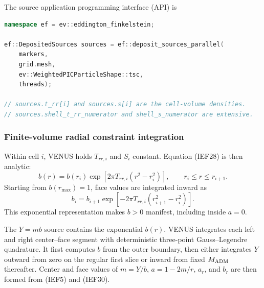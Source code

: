 The source application programming interface (API) is
\begin{lstlisting}[language=C++,basicstyle=\ttfamily\scriptsize]
namespace ef = ev::eddington_finkelstein;

ef::DepositedSources sources = ef::deposit_sources_parallel(
    markers,
    grid.mesh,
    ev::WeightedPICParticleShape::tsc,
    threads);

// sources.t_rr[i] and sources.s[i] are the cell-volume densities.
// sources.shell_t_rr_numerator and shell_s_numerator are extensive.
\end{lstlisting}

\subsubsection{Finite-volume radial constraint integration}

Within cell \(i\), VENUS holds \(T_{rr,i}\) and \(S_i\) constant.  Equation
(IEF28) is then analytic:
\[
 b(r)=b(r_i)\exp\left[
 2\pi T_{rr,i}(r^2-r_i^2)\right],
 \qquad r_i\le r\le r_{i+1}.                           \tag{IEF52}
\]
Starting from \(b(r_{\max})=1\), face values are integrated inward as
\[
 b_i=b_{i+1}\exp\left[-2\pi T_{rr,i}
             (r_{i+1}^2-r_i^2)\right].                 \tag{IEF53}
\]
This exponential representation makes \(b>0\) manifest, including inside
\(a=0\).

The \(Y=mb\) source contains the exponential \(b(r)\).  VENUS integrates each
left and right center--face segment with deterministic three-point
Gauss--Legendre quadrature.  It first computes \(b\) from the outer boundary,
then either integrates \(Y\) outward from zero on the regular first slice or
inward from fixed \(M_{\rm ADM}\) thereafter.  Center and face values of
\(m=Y/b\), \(a=1-2m/r\), \(a_r\), and \(b_r\) are then formed from
(IEF5) and (IEF30).

